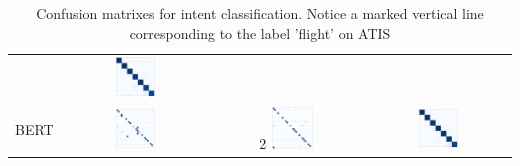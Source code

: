 \documentclass[a4paper]{article}
\begin{document}
\begin{table}[h!]
\begin{adjustbox}{max width=\textwidth}
\begin{tabular}{l|ccc}
			&\includegraphics[width=0.3\textwidth]{"../assets/images/confusion matrixes/CM_BiLSTM_intent_SNIPS_labeless"} \\
			\cmidrule{1-4}
			BERT &  \includegraphics[width=0.3\textwidth]{"../assets/images/confusion matrixes/CM_BERT_intent_ATIS_labeless"} &2 \includegraphics[width=0.3\textwidth]{"../assets/images/confusion matrixes/CM_BERT_intent_remix_ATIS_labeless"} &\includegraphics[width=0.3\textwidth]{"../assets/images/confusion matrixes/CM_BERT_intent_SNIPS_labeless"} \\
		\end{tabular}
	\end{adjustbox}
\caption{Confusion matrixes for intent classification. Notice a marked vertical line corresponding to the label 'flight' on ATIS}
\label{fig:cm_intent}
\end{table}
\end{document}
